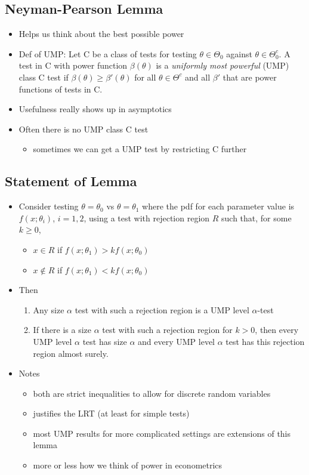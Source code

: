 \subsection{Neyman-Pearson Lemma}

\begin{itemize}
\item Helps us think about the best possible power
\item Def of UMP: Let C be a class of tests for testing $\theta \in \Theta_0$
  against $\theta \in \Theta_0^c$.  A test in C with power function $\beta(\theta)$ is a
  \emph{uniformly most powerful} (UMP) class C test if $\beta(\theta) \geq \beta'(\theta)$
  for all $\theta \in \Theta^c$ and all $\beta'$ that are power functions of tests in
  C.
\item Usefulness really shows up in asymptotics
\item Often there is no UMP class C test
\begin{itemize}
\item sometimes we can get a UMP test by restricting C further
\end{itemize}
\end{itemize}

\subsection{Statement of Lemma}

\begin{itemize}
\item Consider testing $\theta = \theta_0$ vs $\theta = \theta_1$ where the pdf for each
  parameter value is $f(x; \theta_i)$, $i = 1,2$, using a test with
  rejection region $R$ such that, for some $k \geq 0$,
\begin{itemize}
\item $x \in R$ if $f(x; \theta_1) > k f(x; \theta_0)$
\item $x \notin R$ if $f(x; \theta_1) < k f(x; \theta_0)$
\end{itemize}
\item Then
\begin{enumerate}
\item Any size $\alpha$ test with such a rejection region is a UMP level $\alpha$-test
\item If there is a size $\alpha$ test with such a rejection region for $k
  > 0$, then every UMP level $\alpha$ test has size $\alpha$ and every UMP level
  $\alpha$ test has this rejection region almost surely.
\end{enumerate}
\item Notes
\begin{itemize}
\item both are strict inequalities to allow for discrete random
         variables
\item justifies the LRT (at least for simple tests)
\item most UMP results for more complicated settings are extensions
         of this lemma
\item more or less how we think of power in econometrics
\end{itemize}
\end{itemize}

